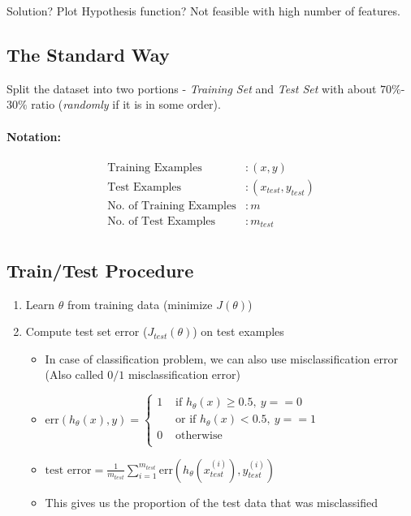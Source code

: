 Solution? Plot Hypothesis function? Not feasible with high number of features.

\subsection{The Standard Way}
Split the dataset into two portions - \emph{Training Set} and \emph{Test Set} with
about $70\%$-$30\%$ ratio (\emph{randomly} if it is in some order).

\paragraph{Notation:}
\begin{align*}
	\text{Training Examples}        & : (x, y)               \\
	\text{Test Examples}            & : (x_{test}, y_{test}) \\
	\text{No. of Training Examples} & : m                    \\
	\text{No. of Test Examples}     & : m_{test}             \\
\end{align*}

\subsection{Train/Test Procedure}
\begin{enumerate}
	\item Learn $\theta$ from training data (minimize $J(\theta)$)
	\item Compute test set error ($J_{test}(\theta)$) on test examples
	      \begin{itemize}
		      \item In case of classification problem, we can also use misclassification
		            error (Also called $0/1$ misclassification error)
		      \item $\text{err}(h_\theta(x), y) = \begin{cases}
				            1 & \text{ if } h_\theta(x) \ge 0.5,\ y == 0   \\
				              & \text{ or if } h_\theta(x) < 0.5, \ y == 1 \\
				            0 & \text{ otherwise }                         \\
			            \end{cases}$
		      \item $\text{test error} = \frac{1}{m_{test}}
			            \sum_{i=1}^{m_{test}}\text{err}
			            (h_\theta(x_{test}^{(i)}), y_{test}^{(i)})$
		      \item This gives us the proportion of the test data that was misclassified
	      \end{itemize}
\end{enumerate}

